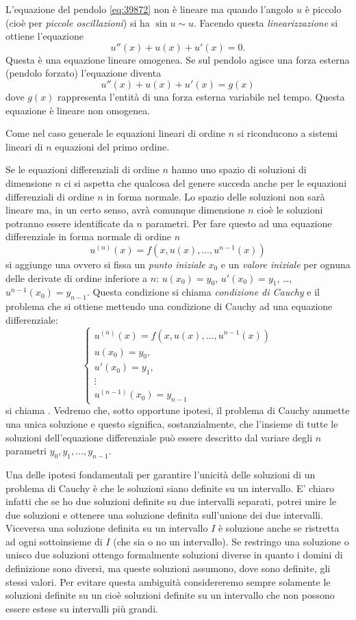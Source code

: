 L'equazione del pendolo \eqref{eq:39872} non è lineare
ma quando l'angolo $u$ è piccolo (cioè per \emph{piccole oscillazioni}) si ha $\sin u \sim u$.
Facendo questa \emph{linearizzazione} si ottiene l'equazione
\[
  u''(x)  + u(x) + u'(x) = 0.
\]
Questa è una equazione lineare omogenea.
Se sul pendolo agisce una forza esterna (pendolo forzato) l'equazione diventa
\[
  u''(x) + u(x) + u'(x) = g(x)
\]
dove $g(x)$ rappresenta l'entità di una forza esterna variabile nel tempo.
Questa equazione è lineare non omogenea.

Come nel caso generale le equazioni lineari di ordine $n$ si riconducono
a sistemi lineari di $n$ equazioni del primo ordine.

Se le equazioni differenziali di ordine $n$ hanno uno spazio di
soluzioni di
dimensione $n$ ci si aspetta che qualcosa del genere succeda anche
per le equazioni differenziali di ordine $n$ in forma normale.
Lo spazio delle soluzioni non sarà lineare ma, in un certo senso,
avrà comunque dimensione $n$ cioè le soluzioni potranno essere identificate
da $n$ parametri.
Per fare questo ad una equazione differenziale in forma normale
di ordine $n$
\[
u^{(n)}(x) = f(x, u(x), \dots, u^{n-1}(x))
\]
si aggiunge una  ovvero si fissa un
\emph{punto iniziale} $x_0$ e un \emph{valore iniziale}
per ognuna delle derivate di ordine inferiore a $n$:
$u(x_0) = y_0$, $u'(x_0)=y_1$, \dots, $u^{n-1}(x_0) = y_{n-1}$.
Questa condizione
si chiama \emph{condizione di Cauchy} e il problema
che si ottiene mettendo una condizione di Cauchy ad una
equazione differenziale:
\[
  \begin{cases}
  u^{(n)}(x) = f(x, u(x), \dots, u^{n-1}(x))\\
  u(x_0) = y_0, \\
  u'(x_0) = y_1, \\
  \vdots\\
  u^{(n-1)}(x_0) = y_{n-1}
  \end{cases}
\]
si chiama .
Vedremo che, sotto opportune ipotesi, il problema di Cauchy
ammette una unica soluzione e questo significa, sostanzialmente,
che l'insieme di tutte le soluzioni dell'equazione differenziale
può essere descritto dal variare
degli $n$ parametri $y_0, y_1, \dots, y_{n-1}$.

Una delle ipotesi fondamentali per garantire l'unicità delle
soluzioni di un problema di Cauchy è che le soluzioni siano
definite su un intervallo. E' chiaro infatti che se ho due
soluzioni definite su due intervalli separati, potrei unire
le due soluzioni e ottenere una soluzione definita sull'unione dei
due intervalli. Viceversa una soluzione definita
su un intervallo $I$ è soluzione anche se ristretta ad ogni sottoinsieme
di $I$ (che sia o no un intervallo).
Se restringo una soluzione o unisco due soluzioni ottengo formalmente
soluzioni diverse in quanto i domini di definizione sono diversi, ma
queste soluzioni assumono, dove sono definite, gli stessi valori.
Per evitare questa ambiguità considereremo sempre solamente
le soluzioni definite su un  cioè
soluzioni definite su un intervallo che non possono essere
estese su intervalli più grandi.


